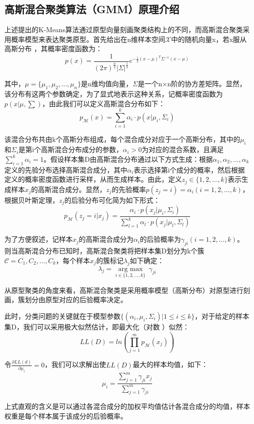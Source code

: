 \documentclass[12pt]{article}
\begin{document}
\subsection{高斯混合聚类算法（GMM）原理介绍}
上述提出的K-Means算法通过原型向量刻画聚类结构上的不同，而高斯混合聚类采用概率模型来表达聚类原型。首先给出在n维样本空间$\mathcal{X}$中的随机向量x，若x服从高斯分布 ，其概率密度函数为：
\[p(x)=\frac{1}{(2\pi)^\frac{n}{2}|\varSigma|^\frac{1}{2}}e^{-\frac{1}{2}(x-\mu)^T\varSigma^{-1}(x-\mu)}\]\par
其中，$\mu=\{\mu_1,\mu_2,\dots,\mu_n\}$是n维均值向量，$\varSigma$是一个n×n阶的协方差矩阵。显然，该分布有这两个参数确定，为了显式地表示这种关系，记概率密度函数为$p(x|\mu,\sum)$，由此我们可以定义高斯混合分布如下：
\[p_{\mathcal{M}}(x)=\sum_{i=1}^k\alpha_i\cdot p(x|\mu_i,\varSigma_i)\]\par
该混合分布共由k个高斯分布组成，每个混合成分对应于一个高斯分布，其中的$\mu_i$和$\varSigma_i$是第i个高斯混合分布成分的参数，$\alpha_i>0$为对应的混合系数，且满足$\sum_{i=1}^k\alpha_i=1$。假设样本集D由高斯混合分布通过以下方式生成：根据$\alpha_1,\alpha_2,\dots,\alpha_k$定义的先验分布选择高斯混合成分，其中$\alpha_i$表示选择第i个成分的概率，然后根据定义的概率密度函数进行采样，从而生成样本。由此，定义$z_j\in\{1,2,\dots,k\}$表示生成样本$x_j$的高斯混合成分。显然，$z_j$的先验概率$p(z_j=i)=\alpha_i(i=1,2,\dots,k)$，根据贝叶斯定理，$z_j$的后验分布可化简为如下形式：
\[p_{\mathcal{M}}(z_j=i|x_j)=\frac{\alpha_i\cdot p(x_j|\mu_i,\varSigma_i)}{\sum_{l=1}^k\alpha_l\cdot p(x_j|\mu_l,\varSigma_l)}\]\par
为了方便叙述，记样本$x_j$的高斯混合成分为$\alpha_i$的后验概率为$\gamma_{ji}(i=1,2,\dots,k)$。则当高斯混合分布已知时，高斯混合聚类将把样本集D划分为k个簇$\mathcal{C}={C_1,C_2,\dots,C_k}$，每个样本$x_j$的簇标记$\lambda_j$如下确定：
\[\lambda_j=\mathop{arg\ max}\limits_{i\in\{1,2,\dots,k\}}\ \gamma_{ji}\]\par
从原型聚类的角度来看，高斯混合聚类是采用概率模型（高斯分布）对原型进行刻画，簇划分由原型对应的后验概率决定。\par
此时，分类问题的关键就在于模型参数$\{(\alpha_i,\mu_i,\varSigma_i)|1\leq i \leq k\}$，对于给定的样本集D，我们可以采用极大似然估计，即最大化（对数 ）似然：
\[LL(D)=ln(\prod_{j=1}^mp_{\mathcal{M}}(x_j))\]\par
令$\frac{\partial LL(d)}{\partial \mu_i}=0$，我们可以求解出使$LL(D)$最大的样本均值，如下：
\[\mu_i=\frac{\sum\limits_{j=1}^m\gamma_{ji}x_j}{\sum\limits_{j=1}^{m}\gamma_{ji}}\]\par
上式直观的含义是可以通过各混合成分的加权平均值估计各混合成分的均值，样本权重是每个样本属于该成分的后验概率。\par
\end{document}
